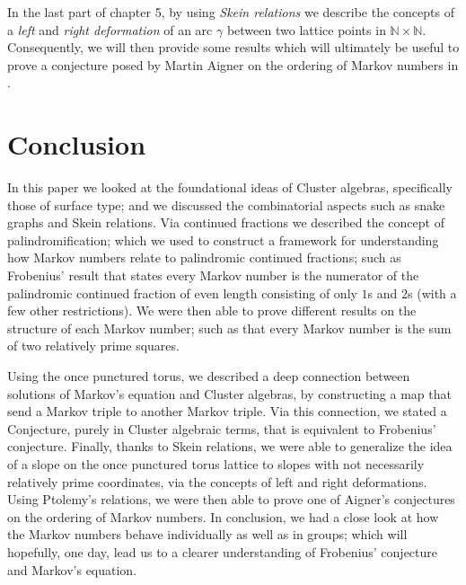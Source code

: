 \documentclass[12pt,vu]{adammath}
\theoremstyle{theorem}
\theoremstyle{corollary}
\theoremstyle{conjecture}
\theoremstyle{proposition}
\theoremstyle{definition}
\theoremstyle{remark}
\begin{document}
In the last part of chapter 5, by using \emph{Skein relations} we describe the concepts of a \emph{left} and \emph{right deformation} of an arc $\gamma$ between two lattice points in $\mathbb{N}\times \mathbb{N}$. Consequently, we will then provide some results which will ultimately be useful to prove a conjecture posed by Martin Aigner on the ordering of Markov numbers in \cite{A}.







\chapter{Conclusion}
In this paper we looked at the foundational ideas of Cluster algebras, specifically those of surface type; and we discussed the combinatorial aspects such as snake graphs and Skein relations. Via continued fractions we described the concept of palindromification; which we used to construct a framework for understanding how Markov numbers relate to palindromic continued fractions; such as Frobenius' result that states every Markov number is the numerator of the palindromic continued fraction of even length consisting of only $1$s and $2$s (with a few other restrictions). We were then able to prove different results on the structure of each Markov number; such as that every Markov number is the sum of two relatively prime squares. 

Using the once punctured torus, we described a deep connection between solutions of Markov's equation and Cluster algebras, by constructing a map that send a Markov triple to another Markov triple. Via this connection, we stated a Conjecture, purely in Cluster algebraic terms, that is equivalent to Frobenius' conjecture. Finally, thanks to Skein relations, we were able to generalize the idea of a slope on the once punctured torus lattice to slopes with not necessarily relatively prime coordinates, via the concepts of left and right deformations. Using Ptolemy's relations, we were then able to prove one of Aigner's conjectures on the ordering of Markov numbers. In conclusion, we had a close look at how the Markov numbers behave individually as well as in groups; which will hopefully, one day, lead us to a clearer understanding of Frobenius' conjecture and Markov's equation. 
 
\printbibliography
\end{document}

